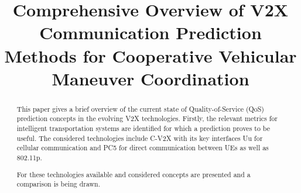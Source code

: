 \documentclass[conference]{IEEEtran}
\begin{document}
%
\title{Comprehensive Overview of V2X Communication Prediction Methods for
Cooperative Vehicular Maneuver Coordination}


\author{
}


\maketitle


\begin{abstract}
  This paper gives a brief overview of the current state of Quality-of-Service (QoS) prediction concepts in the evolving V2X technologies. Firstly, the relevant metrics for intelligent transportation systems are identified for which a prediction proves to be useful. The considered technologies include C-V2X with its key interfaces Uu for cellular communication and PC5 for direct communication between UEs as well as 802.11p.
  
  For these technologies available and considered concepts are presented and a comparison is being drawn.
\end{abstract}





%
\IEEEpeerreviewmaketitle
\end{document}
